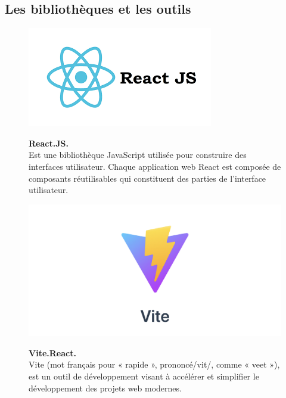 \subsection{Les bibliothèques et les outils}
\begin{figure}[H]
    \centering
    \begin{minipage}[c]{0.3\textwidth}
        \includegraphics[width=\linewidth]{projet/images/diagramme de sequance/images/reactJS.png}
    \end{minipage}
    \hspace{1cm}
    \begin{minipage}[c]{0.6\textwidth}
        \textbf{React.JS.}\\[0.5em]
        Est une bibliothèque JavaScript utilisée pour construire des interfaces utilisateur. Chaque application web React est composée de composants réutilisables qui constituent des parties de l’interface utilisateur.\cite{ref16}
    \end{minipage}
\end{figure}
\vspace{0.5cm}
\begin{figure}[H]
    \centering
    \begin{minipage}[c]{0.3\textwidth}
        \includegraphics[width=\linewidth]{projet/images/diagramme de sequance/images/vite.png}
    \end{minipage}
    \hspace{1cm}
    \begin{minipage}[c]{0.6\textwidth}
        \textbf{Vite.React.}\\[0.5em]
        Vite (mot français pour « rapide », prononcé/vit/, comme « veet »), est un outil de développement visant à accélérer et simplifier le développement des projets web modernes.\cite{ref24}
    \end{minipage}
\end{figure}

